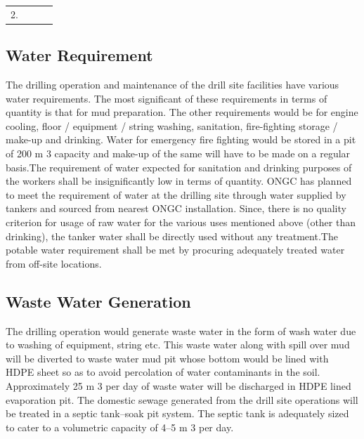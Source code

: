 \documentclass[11pt,a4paper]{article}
\begin{document}
\begin{table}
\begin{tabular}{|l|l|l|l|}
\multirow{2}{*}{2.} & \multirow{2}{*}{}                                                                                          &             &     \\ \cline{3-4} 
                    &                                                                                                            &             &     \\ \hline
\end{tabular}
\end{table}


\subsection{\textbf{Water Requirement}}

The drilling operation and maintenance of the drill site facilities have various water requirements. The most significant of these requirements in terms of quantity is that for mud preparation. The other requirements would be for engine cooling, floor / equipment / string washing, sanitation, fire-fighting storage / make-up and
drinking. Water for emergency fire fighting would be stored in a pit of 200 m 3 capacity and make-up of the same will have to be made on a regular basis.The requirement of water expected for sanitation and drinking purposes of the workers shall be insignificantly low in terms of quantity. ONGC has planned to meet the requirement of water at the drilling site through water supplied by tankers and sourced from nearest ONGC installation. Since, there is no quality criterion for usage of raw water for the various uses mentioned above (other than drinking), the tanker water shall be directly used without any treatment.The potable water requirement shall be met by procuring adequately treated water from off-site locations.

\subsection{\textbf{Waste Water Generation}}

The drilling operation would generate waste water in the form of wash water due to washing of equipment, string etc. This waste water along with spill over mud will be diverted to waste water mud pit whose bottom would be lined with HDPE sheet so as to avoid percolation of water contaminants in the soil. Approximately 25 m 3 per day of waste water will be discharged in HDPE lined evaporation pit. The domestic sewage generated from the drill site operations will be treated in a septic tank–soak pit system. The septic tank is adequately sized to cater to a volumetric capacity of 4–5 m 3 per day.
\end{document}
